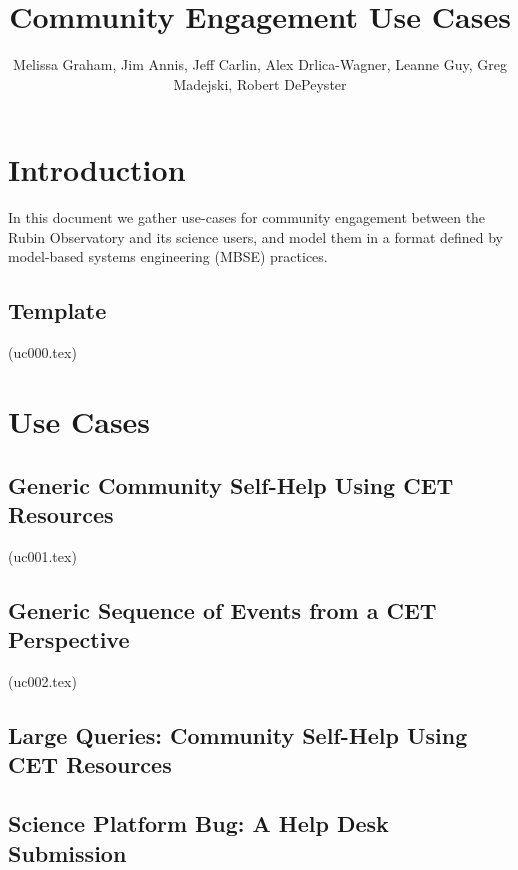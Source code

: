 \documentclass[DM,lsstdraft,authoryear,toc]{lsstdoc}
\title{Community Engagement Use Cases}
\author{%
Melissa Graham,  Jim Annis, Jeff Carlin, Alex Drlica-Wagner, Leanne Guy, Greg Madejski, Robert DePeyster
}
\date{\vcsDate}
\begin{document}
\maketitle



\section{Introduction}

In this document we gather use-cases for community engagement between the Rubin Observatory and its science users, and model them in a format defined by model-based systems engineering (MBSE) practices.

\clearpage
\subsection{Template}
(uc000.tex)

\clearpage
\section{Use Cases}

\clearpage
\subsection{Generic Community Self-Help Using CET Resources}
(uc001.tex)

\clearpage
\subsection{Generic Sequence of Events from a CET Perspective}
(uc002.tex)

\clearpage
\subsection{Large Queries: Community Self-Help Using CET Resources}

\clearpage
\subsection{Science Platform Bug: A Help Desk Submission}
\end{document}
